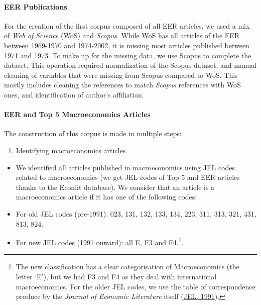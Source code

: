 \documentclass[
  12pt,
  onecolumn]{article}
\providecommand{\tightlist}{%
  \setlength{\itemsep}{0pt}\setlength{\parskip}{0pt}}
\begin{document}
\hypertarget{eer-publications}{%
\paragraph*{EER Publications}\label{eer-publications}}

For the creation of the first corpus composed of all EER articles, we
used a mix of \emph{Web of Science} (WoS) and \emph{Scopus}. While WoS
has all articles of the EER between 1969-1970 and 1974-2002, it is
missing most articles published between 1971 and 1973. To make up for
the missing data, we use Scopus to complete the dataset. This operation
required normalization of the Scopus dataset, and manual cleaning of
variables that were missing from Scopus compared to WoS. This mostly
includes cleaning the references to match \emph{Scopus} references with
WoS ones, and identification of author's affiliation.

\hypertarget{eer-top5-macro}{%
\paragraph*{EER and Top 5 Macroeconomics
Articles}\label{eer-top5-macro}}

The construction of this corpus is made in multiple steps:

\begin{enumerate}
\def\labelenumi{\arabic{enumi}.}
\tightlist
\item
  Identifying macroeconomics articles
\end{enumerate}

\begin{itemize}
\item
  We identified all articles published in macroeconomics using JEL codes
  related to macroeconomics (we get JEL codes of Top 5 and EER articles
  thanks to the Econlit database). We consider that an article is a
  macroeconomics article if it has one of the following codes:
\item
  For old JEL codes (pre-1991): 023, 131, 132, 133, 134, 223, 311, 313,
  321, 431, 813, 824.
\item
  For new JEL codes (1991 onward): all E, F3 and F4.\footnote{The new
    classification has a clear categorisation of Macroeconomics (the
    letter `E'), but we had F3 and F4 as they deal with international
    macroeconomics. For the older JEL codes, we use the table of
    correspondence produce by the \emph{Journal of Economic Literature}
    itself (\protect\hyperlink{ref-jel1991}{JEL, 1991}).}.
\end{itemize}
\end{document}
